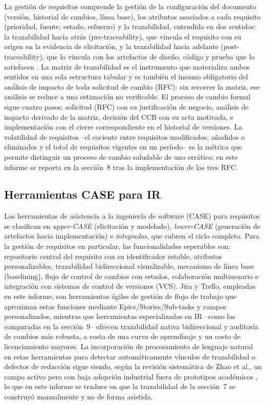 \documentclass[11pt,a4paper]{article}
\begin{document}
La gestión de requisitos comprende la gestión de la configuración del documento (versión,
historial de cambios, línea base), los atributos asociados a cada requisito (prioridad, fuente,
estado, esfuerzo) y la trazabilidad, entendida en dos sentidos: la trazabilidad hacia atrás
(pre-traceability), que vincula el requisito con su origen en la evidencia de elicitación, y la
trazabilidad hacia adelante (post-traceability), que lo vincula con los artefactos de diseño,
código y prueba que lo satisfacen \cite{wang2024}. La matriz de trazabilidad es el instrumento
que materializa ambos sentidos en una sola estructura tabular y es también el insumo obligatorio
del análisis de impacto de toda solicitud de cambio (RFC): sin recorrer la matriz, ese análisis
se reduce a una estimación no verificable. El proceso de cambio formal sigue cuatro pasos:
solicitud (RFC) con su justificación de negocio, análisis de impacto derivado de la matriz,
decisión del CCB con su acta motivada, e implementación con el cierre correspondiente en el
historial de versiones. La volatilidad de requisitos --el cociente entre requisitos modificados,
añadidos o eliminados y el total de requisitos vigentes en un período-- es la métrica que permite
distinguir un proceso de cambio saludable de uno errático; en este informe se reporta en la
sección~8 tras la implementación de las tres RFC.

\subsection{Herramientas CASE para IR}

Las herramientas de asistencia a la ingeniería de software (CASE) para requisitos se clasifican
en \emph{upper-CASE} (elicitación y modelado), \emph{lower-CASE} (generación de artefactos hacia
implementación) e \emph{integradas}, que cubren el ciclo completo. Para la gestión de requisitos
en particular, las funcionalidades esperables son: repositorio central del requisito con su
identificador estable, atributos personalizables, trazabilidad bidireccional visualizable,
mecanismo de línea base (baselining), flujo de control de cambios con estados, colaboración
multiusuario e integración con sistemas de control de versiones (VCS). Jira y Trello, empleadas
en este informe, son herramientas ágiles de gestión de flujo de trabajo que aproximan estas
funciones mediante Epics/Stories/Sub-tasks y campos personalizados, mientras que herramientas
especializadas en IR --como las comparadas en la sección~9-- ofrecen trazabilidad nativa
bidireccional y auditoría de cambios más robusta, a costa de una curva de aprendizaje y un costo
de licenciamiento mayores. La incorporación de procesamiento de lenguaje natural en estas
herramientas para detectar automáticamente vínculos de trazabilidad o defectos de redacción sigue
siendo, según la revisión sistemática de Zhao et al., un campo activo pero con baja adopción
industrial fuera de prototipos académicos \cite{zhao2021}, lo que en este informe se traduce en
que la trazabilidad de la sección~7 se construyó manualmente y no de forma asistida.
\end{document}
